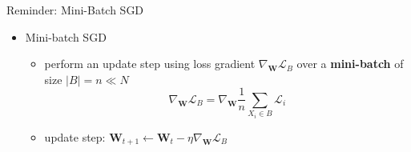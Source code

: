 \begin{frame}{Reminder: Mini-Batch SGD}
\protect\hypertarget{reminder-mini-batch-sgd}{}

\begin{itemize}
\tightlist
\item
  Mini-batch SGD

  \begin{itemize}
  \item
    perform an update step using loss gradient
    \(\nabla_\mathbf{W} \mathcal{L}_B\) over a \textbf{mini-batch} of
    size \(\vert B \vert = n \ll N\)
    \[ \nabla_\mathbf{W} \mathcal{L}_B = \nabla_\mathbf{W} \dfrac{1}{n} {\displaystyle \sum_{X_i \in B} \mathcal{L}_i} \]
  \item
    update step:
    \(\mathbf{W}_{t+1} \leftarrow \mathbf{W}_t - \eta \nabla_\mathbf{W} \mathcal{L}_B\)
  \end{itemize}
\end{itemize}


\end{frame}

